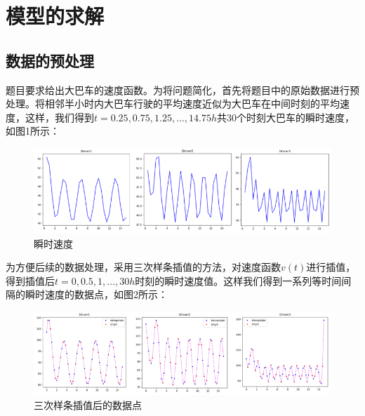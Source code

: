 \documentclass[bwprint]{cumcmthesis}
\begin{document}
    \section{模型的求解}
        \subsection{数据的预处理}
        题目要求给出大巴车的速度函数。为将问题简化，首先将题目中的原始数据进行预处理。将相邻半小时内大巴车行驶的平均速度近似为大巴车在中间时刻的平均速度，这样，我们得到$t=0.25, 0.75, 1.25,\dots, 14.75h$共$30$个时刻大巴车的瞬时速度，如图1所示：
        \begin{figure}[htbp]
            \centering
            \includegraphics[width=1\linewidth]{rawdata.png}
            \caption{瞬时速度}
        \end{figure}
            
        为方便后续的数据处理，采用三次样条插值的方法，对速度函数$v(t)$进行插值，得到插值后$t=0, 0.5, 1,\dots, 30h$时刻的瞬时速度值。这样我们得到一系列等时间间隔的瞬时速度的数据点，如图2所示：
        \begin{figure}[htbp]
            \centering
            \includegraphics[width=1\linewidth]{interpolate.png}
            \caption{三次样条插值后的数据点}
        \end{figure}
        
\end{document}
